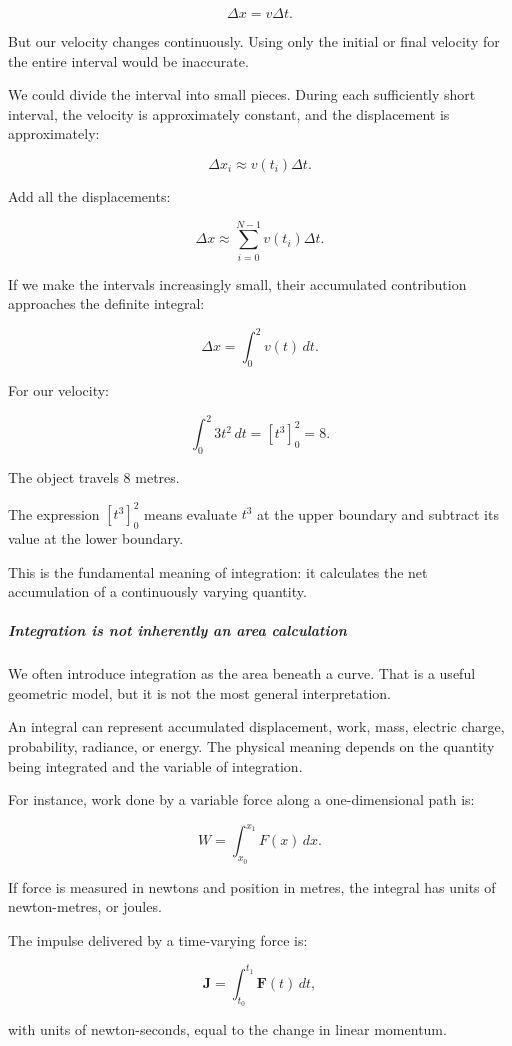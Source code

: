 \[
\Delta x=v\Delta t.
\]

But our velocity changes continuously. Using only the initial or final velocity for the entire interval would be inaccurate.

We could divide the interval into small pieces. During each sufficiently short interval, the velocity is approximately constant, and the displacement is approximately:

\[
\Delta x_i\approx v(t_i)\Delta t.
\]

Add all the displacements:

\[
\Delta x\approx\sum_{i=0}^{N-1}v(t_i)\Delta t.
\]

If we make the intervals increasingly small, their accumulated contribution approaches the definite integral:

\[
\boxed{\Delta x=\int_0^2v(t)\,dt}.
\]

For our velocity:

\[
\int_0^2 3t^2\,dt = \left[t^3\right]_0^2=8.
\]

The object travels 8 metres.

The expression \([t^3]_0^2\) means evaluate \(t^3\) at the upper boundary and subtract its value at the lower boundary.

This is the fundamental meaning of integration: it calculates the net accumulation of a continuously varying quantity.

\subparagraph{Integration is not inherently an area calculation}\label{integration-is-not-inherently-an-area-calculation}

We often introduce integration as the area beneath a curve. That is a useful geometric model, but it is not the most general interpretation.

An integral can represent accumulated displacement, work, mass, electric charge, probability, radiance, or energy. The physical meaning depends on the quantity being integrated and the variable of integration.

For instance, work done by a variable force along a one-dimensional path is:

\[
W=\int_{x_0}^{x_1}F(x)\,dx.
\]

If force is measured in newtons and position in metres, the integral has units of newton-metres, or joules.

The impulse delivered by a time-varying force is:

\[
\mathbf J=\int_{t_0}^{t_1}\mathbf F(t)\,dt,
\]

with units of newton-seconds, equal to the change in linear momentum.

